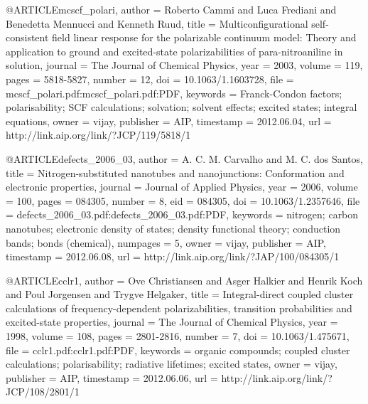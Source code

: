 @ARTICLE{mcscf_polari,
  author = {Roberto Cammi and Luca Frediani and Benedetta Mennucci and Kenneth
	Ruud},
  title = {Multiconfigurational self-consistent field linear response for the
	polarizable continuum model: Theory and application to ground and
	excited-state polarizabilities of para-nitroaniline in solution},
  journal = {The Journal of Chemical Physics},
  year = {2003},
  volume = {119},
  pages = {5818-5827},
  number = {12},
  doi = {10.1063/1.1603728},
  file = {mcscf_polari.pdf:mcscf_polari.pdf:PDF},
  keywords = {Franck-Condon factors; polarisability; SCF calculations; solvation;
	solvent effects; excited states; integral equations},
  owner = {vijay},
  publisher = {AIP},
  timestamp = {2012.06.04},
  url = {http://link.aip.org/link/?JCP/119/5818/1}
}

@ARTICLE{defects_2006_03,
  author = {A. C. M. Carvalho and M. C. dos Santos},
  title = {Nitrogen-substituted nanotubes and nanojunctions: Conformation and
	electronic properties},
  journal = {Journal of Applied Physics},
  year = {2006},
  volume = {100},
  pages = {084305},
  number = {8},
  eid = {084305},
  doi = {10.1063/1.2357646},
  file = {defects_2006_03.pdf:defects_2006_03.pdf:PDF},
  keywords = {nitrogen; carbon nanotubes; electronic density of states; density
	functional theory; conduction bands; bonds (chemical)},
  numpages = {5},
  owner = {vijay},
  publisher = {AIP},
  timestamp = {2012.06.08},
  url = {http://link.aip.org/link/?JAP/100/084305/1}
}

@ARTICLE{cclr1,
  author = {Ove Christiansen and Asger Halkier and Henrik Koch and Poul Jorgensen
	and Trygve Helgaker},
  title = {Integral-direct coupled cluster calculations of frequency-dependent
	polarizabilities, transition probabilities and excited-state properties},
  journal = {The Journal of Chemical Physics},
  year = {1998},
  volume = {108},
  pages = {2801-2816},
  number = {7},
  doi = {10.1063/1.475671},
  file = {cclr1.pdf:cclr1.pdf:PDF},
  keywords = {organic compounds; coupled cluster calculations; polarisability; radiative
	lifetimes; excited states},
  owner = {vijay},
  publisher = {AIP},
  timestamp = {2012.06.06},
  url = {http://link.aip.org/link/?JCP/108/2801/1}
}

